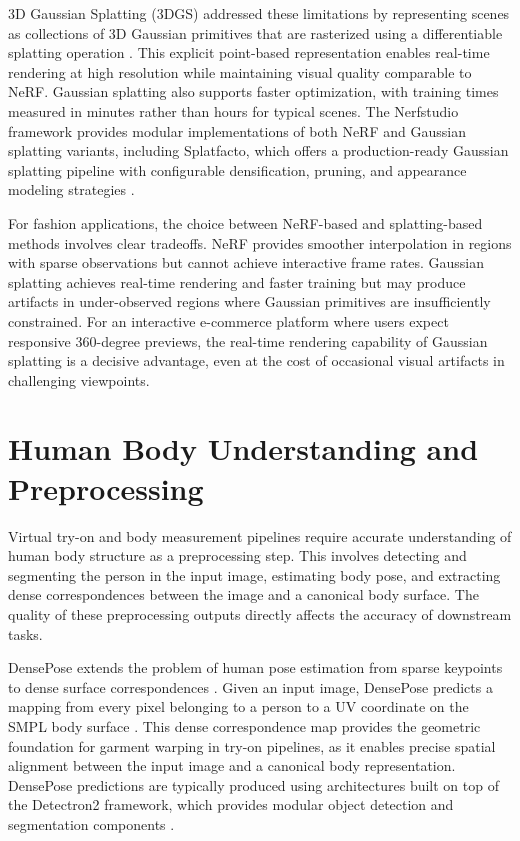 3D Gaussian Splatting (3DGS) addressed these limitations by representing scenes as collections of 3D Gaussian primitives that are rasterized using a differentiable splatting operation \cite{kerbl2023gaussians}. This explicit point-based representation enables real-time rendering at high resolution while maintaining visual quality comparable to NeRF. Gaussian splatting also supports faster optimization, with training times measured in minutes rather than hours for typical scenes. The Nerfstudio framework provides modular implementations of both NeRF and Gaussian splatting variants, including Splatfacto, which offers a production-ready Gaussian splatting pipeline with configurable densification, pruning, and appearance modeling strategies \cite{tancik2023nerfstudio}.

For fashion applications, the choice between NeRF-based and splatting-based methods involves clear tradeoffs. NeRF provides smoother interpolation in regions with sparse observations but cannot achieve interactive frame rates. Gaussian splatting achieves real-time rendering and faster training but may produce artifacts in under-observed regions where Gaussian primitives are insufficiently constrained. For an interactive e-commerce platform where users expect responsive 360-degree previews, the real-time rendering capability of Gaussian splatting is a decisive advantage, even at the cost of occasional visual artifacts in challenging viewpoints.

\section{Human Body Understanding and Preprocessing}
Virtual try-on and body measurement pipelines require accurate understanding of human body structure as a preprocessing step. This involves detecting and segmenting the person in the input image, estimating body pose, and extracting dense correspondences between the image and a canonical body surface. The quality of these preprocessing outputs directly affects the accuracy of downstream tasks.

DensePose extends the problem of human pose estimation from sparse keypoints to dense surface correspondences \cite{guler2018densepose}. Given an input image, DensePose predicts a mapping from every pixel belonging to a person to a UV coordinate on the SMPL body surface \cite{loper2015smpl}. This dense correspondence map provides the geometric foundation for garment warping in try-on pipelines, as it enables precise spatial alignment between the input image and a canonical body representation. DensePose predictions are typically produced using architectures built on top of the Detectron2 framework, which provides modular object detection and segmentation components \cite{wu2019detectron2}.

